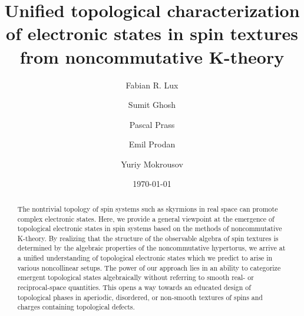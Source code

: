 \documentclass[
    10pt,
    aps,
    prl,
    twocolumn,
    floatfix,
    superscriptaddress
]{revtex4-2}
\begin{document}

\setcounter{secnumdepth}{2} 


\title{
\texorpdfstring{
    Unified  topological characterization of electronic states in spin textures \\ from noncommutative K-theory
    }
    {
    Unified  topological characterization of electronic states in spin textures from noncommutative K-theory
    }
}

\author{Fabian R. Lux}
    \affiliation{\mainz}
    \affiliation{\nyc}

\author{Sumit Ghosh}
   \affiliation{\pgi} 
   
\author{Pascal Prass}
    \affiliation{\mainz}
    
\author{Emil Prodan}
    \affiliation{\nyc}
    
\author{Yuriy Mokrousov}
    \affiliation{\pgi}
    \affiliation{\mainz}

\date{\today}

\begin{abstract}
The nontrivial topology of spin systems such as skyrmions in real space can promote complex electronic states.
Here, we provide a general viewpoint at the emergence of topological electronic states in spin systems based on the methods of noncommutative K-theory. 
By realizing that the structure of the observable algebra of spin textures is determined by the algebraic properties of the noncommutative hypertorus, we arrive at a unified understanding of topological electronic states which we predict to arise in various noncollinear setups. 
The power of our approach lies in an ability to categorize emergent topological states algebraically without referring to smooth real- or reciprocal-space quantities. 
This opens a way towards an educated design of topological phases in aperiodic, disordered, or non-smooth textures of spins and charges containing topological defects. 
\end{abstract}


\maketitle

\end{document}
